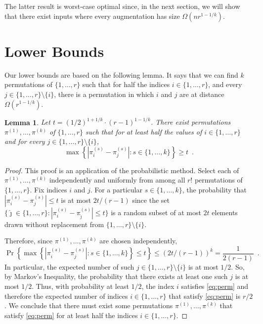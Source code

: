 \documentclass[11pt]{patmorin}
\newtheorem{lemma}[theorem]{Lemma}
\begin{document}
The latter result is worst-case optimal since, in the next section, we will show that there exist inputs where every augmentation has size $\Omega(nr^{1-1/k})$.


\section{Lower Bounds}\label{section:Lower bound}

Our lower bounds are based on the following lemma. It says that we can find $k$ permutations of $\{1,\ldots,r\}$ such that for half the indices $i\in\{1,\ldots,r\}$, and every $j\in\{1,\ldots,r\}\setminus\{i\}$, there is a permutation in which $i$ and $j$ are at distance $\Omega(r^{1-1/k})$.

\begin{lemma}\label{lem:permutations}
Let $t=(1/2)^{1+1/k}\cdot(r-1)^{1-1/k}$.  There exist permutations $\pi^{(1)},\ldots,\pi^{(k)}$ of $\{1,\ldots,r\}$ such that for at least half the values of $i\in\{1,\ldots,r\}$ and for every $j\in\{1,\ldots,r\}\setminus\{i\}$,
\begin{equation}
 \max\left\{\left|\pi^{(s)}_i-\pi^{(s)}_j\right|\colon s\in\{1,\ldots,k\} \right\}
 \ge t \enspace .
     \label{eq:perm}
\end{equation}
\end{lemma}

\begin{proof}
  This proof is an application of the probabilistic method.  Select each
  of $\pi^{(1)},\ldots,\pi^{(k)}$ independently and uniformly from among
  all $r!$ permutations of $\{1,\ldots,r\}$.  Fix indices $i$
  and $j$.  For a particular $s\in\{1,\ldots,k\}$, the
  probability that $|\pi^{(s)}_i-\pi^{(s)}_j|\le t$ is at most $2t/(r-1)$
  since the set
  $\{\hat \jmath\in\{1,\ldots,r\} \colon |\pi^{(s)}_i-\pi^{(s)}_{\hat
   \jmath}|\le t\}$ is a random subset of at most $2t$ elements drawn without
  replacement from $\{1,\ldots,r\}\setminus \{i\}$.

  Therefore, since $\pi^{(1)},\ldots,\pi^{(k)}$ are chosen independently, 
  \[
    \Pr\left\{\max\left\{\left|\pi^{(s)}_i-\pi^{(s)}_j\right|\colon s\in\{1,\ldots,k\} \right\}\le t\right\} \le (2t/(r-1))^k = \frac{1}{2(r-1)} \enspace .
  \]
  In particular, the expected number of such
  $j\in\{1,\ldots,r\}\setminus\{i\}$ is at most $1/2$. So, by Markov's
  Inequality, the probability that there exists at least one such $j$
  is at most $1/2$.  Thus, with probability at least $1/2$, the index $i$
  satisfies \eqref{eq:perm} and therefore the expected number of indices $i\in\{1,\ldots,r\}$
  that satisfy \eqref{eq:perm} is $r/2$.  We conclude that there must exist
  some permutations $\pi^{(1)},\ldots,\pi^{(k)}$ that satisfy \eqref{eq:perm}
  for at least half the indices $i\in\{1,\ldots,r\}$.
\end{proof}
\end{document}
